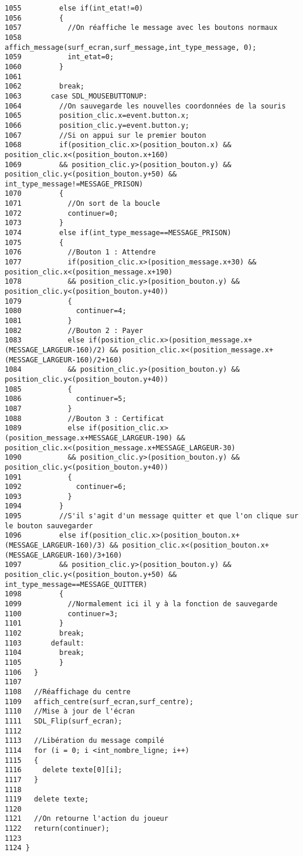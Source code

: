 \begin{Code}
\begin{verbatim}
1055         else if(int_etat!=0)
1056         {
1057           //On réaffiche le message avec les boutons normaux
1058           affich_message(surf_ecran,surf_message,int_type_message, 0);
1059           int_etat=0;
1060         }
1061         
1062         break;
1063       case SDL_MOUSEBUTTONUP:
1064         //On sauvegarde les nouvelles coordonnées de la souris
1065         position_clic.x=event.button.x;
1066         position_clic.y=event.button.y;
1067         //Si on appui sur le premier bouton
1068         if(position_clic.x>(position_bouton.x) && position_clic.x<(position_bouton.x+160)
1069         && position_clic.y>(position_bouton.y) && position_clic.y<(position_bouton.y+50) && int_type_message!=MESSAGE_PRISON)
1070         {
1071           //On sort de la boucle
1072           continuer=0;
1073         }
1074         else if(int_type_message==MESSAGE_PRISON)
1075         {
1076           //Bouton 1 : Attendre
1077           if(position_clic.x>(position_message.x+30) && position_clic.x<(position_message.x+190)
1078           && position_clic.y>(position_bouton.y) && position_clic.y<(position_bouton.y+40))
1079           {
1080             continuer=4;
1081           }
1082           //Bouton 2 : Payer
1083           else if(position_clic.x>(position_message.x+(MESSAGE_LARGEUR-160)/2) && position_clic.x<(position_message.x+(MESSAGE_LARGEUR-160)/2+160)
1084           && position_clic.y>(position_bouton.y) && position_clic.y<(position_bouton.y+40))
1085           {
1086             continuer=5;
1087           }
1088           //Bouton 3 : Certificat
1089           else if(position_clic.x>(position_message.x+MESSAGE_LARGEUR-190) && position_clic.x<(position_message.x+MESSAGE_LARGEUR-30)
1090           && position_clic.y>(position_bouton.y) && position_clic.y<(position_bouton.y+40))
1091           {
1092             continuer=6;
1093           }
1094         }
1095         //S'il s'agit d'un message quitter et que l'on clique sur le bouton sauvegarder
1096         else if(position_clic.x>(position_bouton.x+(MESSAGE_LARGEUR-160)/3) && position_clic.x<(position_bouton.x+(MESSAGE_LARGEUR-160)/3+160)
1097         && position_clic.y>(position_bouton.y) && position_clic.y<(position_bouton.y+50) && int_type_message==MESSAGE_QUITTER)
1098         {
1099           //Normalement ici il y à la fonction de sauvegarde
1100           continuer=3;
1101         }
1102         break;
1103       default:
1104         break;
1105         }
1106   }
1107   
1108   //Réaffichage du centre
1109   affich_centre(surf_ecran,surf_centre);
1110   //Mise à jour de l'écran
1111   SDL_Flip(surf_ecran);
1112   
1113   //Libération du message compilé
1114   for (i = 0; i <int_nombre_ligne; i++)
1115   {
1116     delete texte[0][i];
1117   }
1118   
1119   delete texte;
1120   
1121   //On retourne l'action du joueur
1122   return(continuer);
1123   
1124 }
\end{verbatim}\end{Code}


